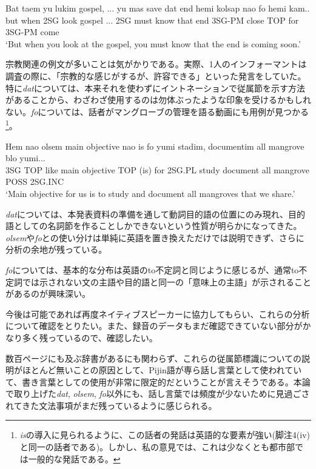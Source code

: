 \documentclass[11pt,a4paper]{jsarticle}
\begin{document}
\begin{exe}
\ex\label{bokushi}
\gll Bat taem yu lukim gospel, ... yu mas save dat end hemi kolsap nao fo hemi kam..\\
but when 2SG look gospel ... 2SG must know that end 3SG-PM close TOP for 3SG-PM come\\
\glt `But when you look at the gospel, you must know that the end is coming soon.'
\end{exe}

宗教関連の例文が多いことは気がかりである。実際、1人のインフォーマントは調査の際に、「宗教的な感じがするが、許容できる」といった発言をしていた。特に\textit{dat}については、本来それを使わずにイントネーションで従属節を示す方法があることから、わざわざ使用するのは勿体ぶったような印象を受けるかもしれない。\textit{fo}については、話者がマングローブの管理を語る動画\citep{manguru}にも用例が見つかる\footnote{\textit{is}の導入に見られるように、この話者の発話は英語的な要素が強い(脚注4(iv)と同一の話者である)。しかし、私の意見では、これは少なくとも都市部では一般的な発話である。}。

\begin{exe}
\ex\label{manguru1}
\gll Hem nao olsem main objective nao is fo yumi stadim, documentim all mangrove blo yumi...\\
3SG TOP like main objective TOP (is) for 2SG.PL study document all mangrove POSS 2SG.INC\\
\glt `Main objective for us is to study and document all mangroves that we share.'\citep[20分4秒]{manguru}
\end{exe}

\textit{dat}については、本発表資料の準備を通して動詞目的語の位置にのみ現れ、目的語としての名詞節を作ることしかできないという性質が明らかになってきた。\textit{olsem}や\textit{fo}との使い分けは単純に英語を置き換えただけでは説明できず、さらに分析の余地が残っている。

\textit{fo}については、基本的な分布は英語のto不定詞と同じように感じるが、通常to不定詞では示されない文の主語や目的語と同一の「意味上の主語」が示されることがあるのが興味深い。

今後は可能であれば再度ネイティブスピーカーに協力してもらい、これらの分析について確認をとりたい。また、録音のデータもまだ確認できていない部分がかなり多く残っているので、確認したい。


数百ページにも及ぶ辞書\cite{dictionary}があるにも関わらず、これらの従属節標識についての説明がほとんど無いことの原因として、Pijin語が専ら話し言葉として使われていて、書き言葉としての使用が非常に限定的だということが言えそうである。本論で取り上げた\textit{dat}, \textit{olsem}, \textit{fo}以外にも、話し言葉では頻度が少ないために見過ごされてきた文法事項がまだ残っているように感じられる。


\end{document}
